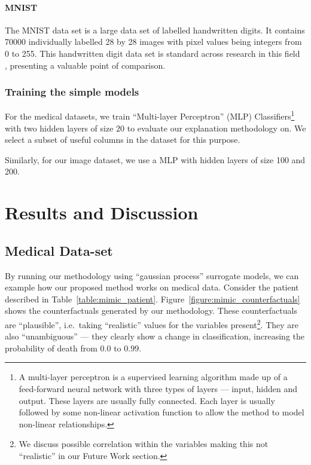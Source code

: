 \documentclass{article}
\begin{document}
\paragraph{MNIST}
The MNIST data set is a large data set of labelled handwritten digits. It contains 70000 individually labelled 28 by 28 images with pixel values being integers from 0 to 255. This handwritten digit data set is standard across research in this field~\cite{verma_counterfactual_2022}
, presenting a valuable point of comparison. 

\subsubsection{Training the simple models}
For the medical datasets, we train ``Multi-layer Perceptron'' (MLP) Classifiers\footnote{
A multi-layer perceptron is a supervised learning algorithm made up of a feed-forward neural network with three types of layers --- input, hidden and output. These layers are usually fully connected. Each layer is usually followed by some non-linear activation function to allow the method to model non-linear relationships.
} with two hidden layers of size \(20\) to evaluate our explanation methodology on. We select a subset of useful columns in the dataset for this purpose.

Similarly, for our image dataset, we use a MLP with hidden layers of size 100 and 200.



\section{Results and Discussion}
\subsection{Medical Data-set}
By running our methodology using ``gaussian process'' surrogate models, we can example how our proposed method works on medical data. Consider the patient described in Table~\ref{table:mimic_patient}. Figure~\ref{figure:mimic_counterfactuals} shows the counterfactuals generated by our methodology. These counterfactuals are ``plausible'', i.e.\ taking ``realistic'' values for the variables present\footnote{We discuss possible correlation within the variables making this not ``realistic'' in our Future Work section.}. They are also ``unambiguous'' --- they clearly show a change in classification, increasing the probability of death from \(0.0\) to \(0.99\). 
\end{document}

